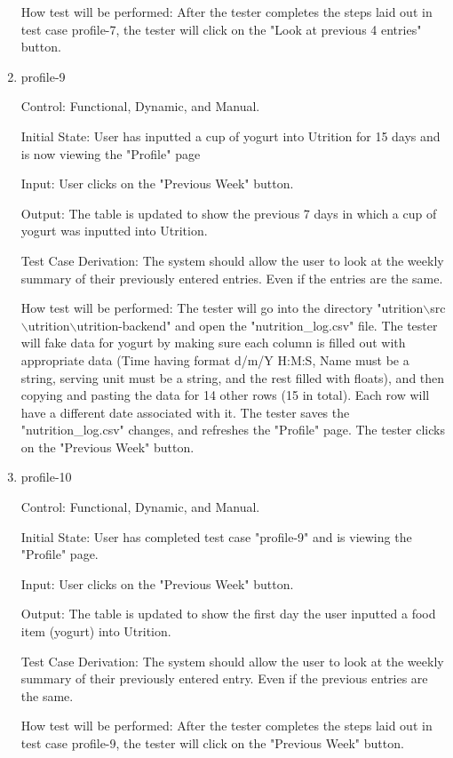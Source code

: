 \documentclass[12pt, titlepage]{article}
\begin{document}
\begin{enumerate}
		How test will be performed: After the tester completes the steps laid out in test case profile-7, the tester will click on the "Look at previous 4 entries" button.
		
		\item{profile-9\\}
		
		Control: Functional, Dynamic, and Manual.
		
		Initial State: User has inputted a cup of yogurt into Utrition for 15 days and is now viewing the "Profile" page
		
		Input: User clicks on the "Previous Week" button.
		
		Output: The table is updated to show the previous 7 days in which a cup of yogurt was inputted into Utrition. 
		
		Test Case Derivation: The system should allow the user to look at the weekly summary of their previously entered entries. Even if the entries are the same.
		
		How test will be performed: The tester will go into the directory "utrition$\backslash$src$\backslash$utrition$\backslash$utrition-backend" and open the "nutrition\_log.csv" file. The tester will fake data for yogurt by making sure each column is filled out with appropriate data (Time having format d/m/Y H:M:S, Name must be a string, serving unit must be a string, and the rest filled with floats), and then copying and pasting the data for 14 other rows (15 in total). Each row will have a different date associated with it. The tester saves the "nutrition\_log.csv" changes, and refreshes the "Profile" page. The tester clicks on the "Previous Week" button.
		
		\item{profile-10\\}
		
		Control: Functional, Dynamic, and Manual.
		
		Initial State: User has completed test case "profile-9" and is viewing the "Profile" page.
		
		Input: User clicks on the "Previous Week" button.
		
		Output: The table is updated to show the first day the user inputted a food item (yogurt) into Utrition.
		
		Test Case Derivation: The system should allow the user to look at the weekly summary of their previously entered entry. Even if the previous entries are the same.
		
		How test will be performed: After the tester completes the steps laid out in test case profile-9, the tester will click on the "Previous Week" button.
		

\end{enumerate}
\end{document}
